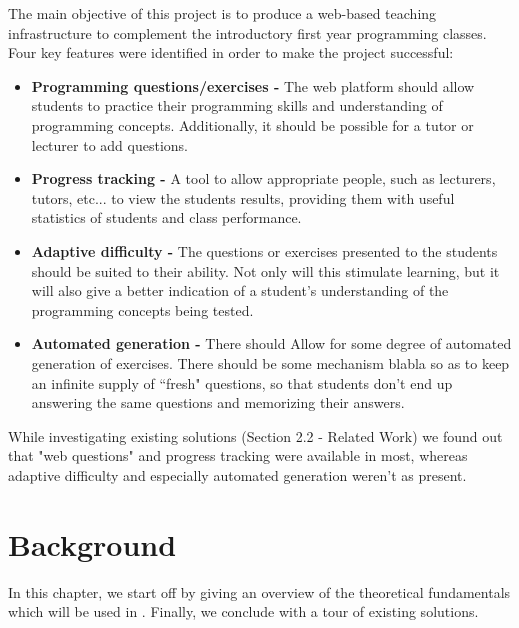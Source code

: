 \documentclass[11pt,a4paper]{report}
\begin{document}
The main objective of this project is to produce a web-based teaching infrastructure to complement the introductory first year programming classes. Four key features were identified in order to make the project successful:

\begin{itemize}
\item \textbf{Programming questions/exercises -} The web platform should allow students to practice their programming skills and understanding of programming concepts. Additionally, it should be possible for a tutor or lecturer to add questions.
\item \textbf{Progress tracking -} A tool to allow appropriate people, such as lecturers, tutors, etc... to view the students results, providing them with useful statistics of students and class performance.
\item \textbf{Adaptive difficulty -} The questions or exercises presented to the students should be suited to their ability. Not only will this stimulate learning, but it will also give a better indication of a student's understanding of the programming concepts being tested.
\item \textbf{Automated generation -} There should 
Allow for some degree of automated generation of exercises. There should be some mechanism blabla so as to keep an infinite supply of ``fresh" questions, so that students don't end up answering the same questions and memorizing their answers.
\end{itemize}

While investigating existing solutions (Section 2.2 - Related Work) we found out that "web questions" and progress tracking were available in most, whereas adaptive difficulty and especially automated generation weren't as present. 


\chapter{Background}
In this chapter, we start off by giving an overview of the theoretical fundamentals which will be used in . Finally, we conclude with a tour of existing solutions.
\end{document}
